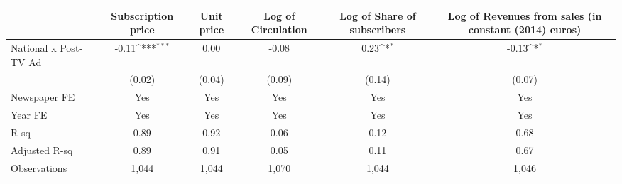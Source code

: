 {
\def\sym#1{\ifmmode^{#1}\else\(^{#1}\)\fi}
\begin{tabular}{l*{5}{c}}
\hline\hline
                    &\multicolumn{1}{c}{Subscription price}&\multicolumn{1}{c}{Unit price}&\multicolumn{1}{c}{Log of Circulation}&\multicolumn{1}{c}{Log of  Share of subscribers}&\multicolumn{1}{c}{Log of Revenues from sales (in constant (2014) euros)}\\
\hline
National x Post-TV Ad&       -0.11\sym{***}&        0.00         &       -0.08         &        0.23\sym{*}  &       -0.13\sym{*}  \\
                    &      (0.02)         &      (0.04)         &      (0.09)         &      (0.14)         &      (0.07)         \\
\hline
Newspaper FE        &         Yes         &         Yes         &         Yes         &         Yes         &         Yes         \\
Year FE             &         Yes         &         Yes         &         Yes         &         Yes         &         Yes         \\
R-sq                &        0.89         &        0.92         &        0.06         &        0.12         &        0.68         \\
Adjusted R-sq       &        0.89         &        0.91         &        0.05         &        0.11         &        0.67         \\
Observations        &       1,044         &       1,044         &       1,070         &       1,044         &       1,046         \\
\hline\hline
\end{tabular}
}
